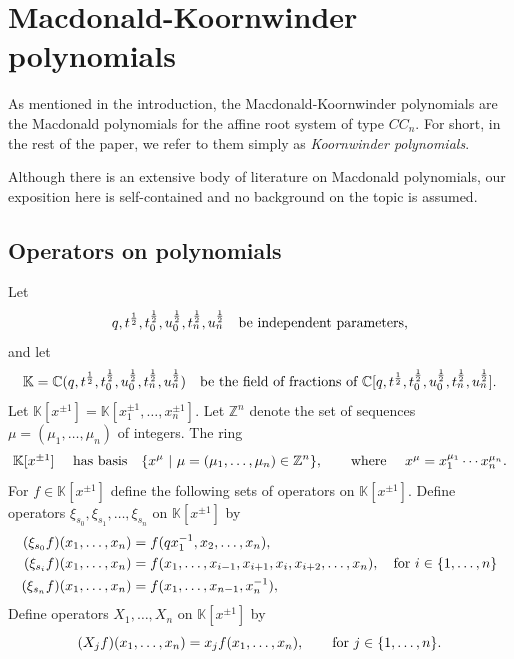 \documentclass[11pt]{article}
\theoremstyle{plain}
\theoremstyle{definition}
\theoremstyle{remark}
\numberwithin{equation}{section}
\def\CC{\mathbb{C}}
\def\KK{\mathbb{K}}
\def\ZZ{\mathbb{Z}}
\newcounter{r}
\newcounter{s}
\begin{document}
\section{Macdonald-Koornwinder polynomials}\label{sec: Koornwinder poly}
As mentioned in the introduction, the Macdonald-Koornwinder polynomials are the Macdonald polynomials for the affine root system of type $CC_n$. For short, in the rest of the paper, we refer to them simply as \emph{Koornwinder polynomials}.

Although there is an extensive body of literature on Macdonald polynomials, our exposition here is self-contained and no background on the topic is assumed. 

\subsection{Operators on polynomials}

Let
$$
q, t^{\frac12}, t_0^{\frac12}, u_0^{\frac12}, t_n^{\frac12}, u_n^{\frac12} \quad\hbox{be independent parameters,}
$$
and let
$$\KK = \CC(q, t^{\frac12}, t_0^{\frac12}, u_0^{\frac12}, t_n^{\frac12}, u_n^{\frac12} )
\quad\hbox{be the field of fractions of $\CC[q, t^{\frac12}, t_0^{\frac12}, u_0^{\frac12}, t_n^{\frac12}, u_n^{\frac12} ]$.}  
$$
Let $\KK[x^{\pm1}] = \KK[x_1^{\pm1}, \ldots, x_n^{\pm1}]$.  
Let $\ZZ^n$ denote the set of sequences $\mu = (\mu_1, \ldots, \mu_n)$ of integers.
The ring 
$$\hbox{$\KK[x^{\pm1}] \quad $ has basis}\quad
\{ x^\mu\ |\ \mu = (\mu_1 ,\ldots, \mu_n) \in \ZZ^n\},
\qquad\hbox{where
\quad
$x^\mu = x_1^{\mu_1}\cdots x_n^{\mu_n}$.}
$$
For $f\in \KK[x^{\pm1}]$ define the following sets of operators on $\KK[x^{\pm1}]$. \newline
Define operators $\xi_{s_0}, \xi_{s_1}, \ldots, \xi_{s_n}$ on $\KK[x^{\pm1}]$ by
\begin{align}
(\xi_{s_0}f)(x_1, \ldots, x_n) &= f(qx^{-1}_1, x_2, \ldots, x_n), \nonumber \\
(\xi_{s_i}f)(x_1, \ldots, x_n) &= f(x_1, \ldots, x_{i-1}, x_{i+1}, x_i, x_{i+2}, \ldots, x_n), \quad \hbox{for  $i\in \{1, \ldots, n\}$} 
\label{xisiopdefn}
\\
(\xi_{s_n}f)(x_1, \ldots, x_n) &= f(x_1, \ldots, x_{n-1}, x^{-1}_n),  \nonumber
\end{align} 
Define operators $X_1, \ldots, X_n$ on $\KK[x^{\pm1}]$ by
\begin{equation}
(X_j f)(x_1, \ldots, x_n) = x_j f(x_1, \ldots, x_n), \qquad \hbox{for  $j\in \{1, \ldots, n\}$.} 
\label{polyaction}
\end{equation}
\end{document}
